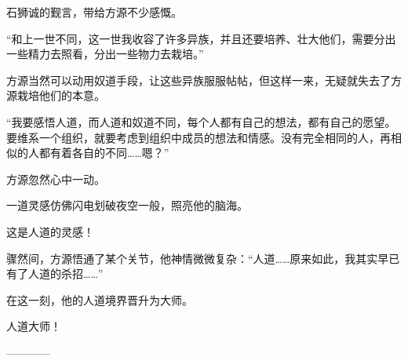 \begin{this_body}
石狮诚的觐言，带给方源不少感慨。

“和上一世不同，这一世我收容了许多异族，并且还要培养、壮大他们，需要分出一些精力去照看，分出一些物力去栽培。”

方源当然可以动用奴道手段，让这些异族服服帖帖，但这样一来，无疑就失去了方源栽培他们的本意。

“我要感悟人道，而人道和奴道不同，每个人都有自己的想法，都有自己的愿望。要维系一个组织，就要考虑到组织中成员的想法和情感。没有完全相同的人，再相似的人都有着各自的不同……嗯？”

方源忽然心中一动。

一道灵感仿佛闪电划破夜空一般，照亮他的脑海。

这是人道的灵感！

骤然间，方源悟通了某个关节，他神情微微复杂：“人道……原来如此，我其实早已有了人道的杀招……”

在这一刻，他的人道境界晋升为大师。

人道大师！

------------

\end{this_body}

